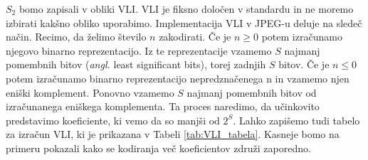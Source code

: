 \documentclass[a4paper,12pt,openright]{book}
\begin{document}
$S_2$ bomo zapisali v obliki VLI. VLI je fiksno določen v standardu in ne moremo izbirati kakšno obliko uporabimo. Implementacija VLI v JPEG-u deluje na sledeč način. Recimo, da želimo število $n$ zakodirati. Če je $n \geq 0$ potem izračunamo njegovo binarno reprezentacijo. Iz te reprezentacije vzamemo $S$ najmanj pomembnih bitov (\textit{angl.} least significant bits), torej zadnjih $S$ bitov. Če je $n \leq 0$ potem izračunamo binarno reprezentacijo nepredznačenega n in vzamemo njen eniški komplement. Ponovno vzamemo $S$ najmanj pomembnih bitov od izračunanega eniškega komplementa. Ta proces naredimo, da učinkovito predstavimo koeficiente, ki vemo da so manjši od $2^{S}$. Lahko zapišemo tudi tabelo za izračun VLI, ki je prikazana v Tabeli \ref{tab:VLI_tabela}. Kasneje bomo na primeru pokazali kako se kodiranja več koeficientov združi zaporedno.
\begin{table}[ht]
\centering
{}
\caption{Reprezentacija celih števil v VLI}
\label{tab:VLI_tabela}
\end{table}
\end{document}
